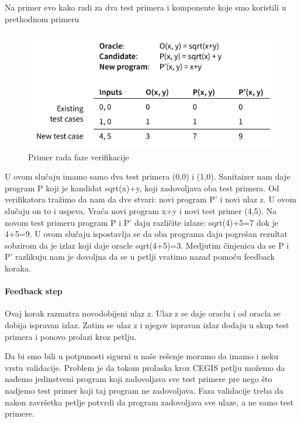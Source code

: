 Na primer evo kako radi za dva test primera i komponente koje smo koristili u prethodnom primeru

\begin{figure}[h!]
\begin{center}
\includegraphics[scale=0.6]{resources/oracle-table.png}
\end{center}
\caption{Primer rada faze verifikacije }
\label{fig:oraclePrimer}
\end{figure}


U ovom slučaju imamo samo dva test primera (0,0) i (1,0). Sanitaizer nam daje program P koji je kandidat sqrt(x)+y, koji zadovoljava oba test primera. Od verifikatora tražimo da nam da dve stvari: novi program P' i novi ulaz z. U ovom slučaju on to i uspeva. Vraća novi program x+y i novi test primer (4,5). Na novom test primeru program P i P' daju različite izlaze: sqrt(4)+5=7 dok je 4+5=9. U ovom slučaju ispostavlja se da oba programa daju pogrešan rezultat sobzirom da je izlaz koji daje oracle sqrt(4+5)=3. Medjutim činjenica da se P i P' razlikuju nam je dovoljna da se u petlji vratimo nazad pomoću feedback koraka.

\paragraph{Feedback step}

Ovaj korak razmatra novodobijeni ulaz z. Ulaz z se daje oraclu i od oracla se dobija ispravan izlaz. Zatim se ulaz z i njegov ispravan izlaz dodaju u skup test primera i ponovo prolazi kroz petlju.

Da bi smo bili u potpunosti sigurni u naše rešenje moramo da imamo i neku vrstu validacije. Problem je da tokom prolaska kroz CEGIS petlju možemo da nađemo jedinstveni program koji zadovoljava sve test primere pre nego što nadjemo test primer koji taj program ne zadovoljava. Faza validacije treba da nakon završetka petlje potvrdi da program zadovoljava sve ulaze, a ne samo test primere.

